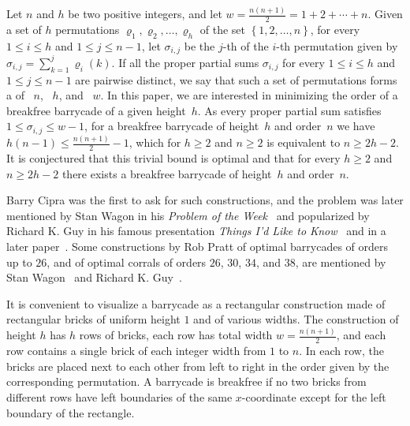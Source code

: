 \documentclass[runningheads,envcountsame]{llncs}
\newcommand{\set}[1]{\left\{ #1 \right\}}
\let\le\leqslant
\let\ge\geqslant
\let\rho\varrho
\begin{document}
Let $n$ and $h$ be two positive integers, and let $w=\frac{n(n+1)}{2} = 1 + 2 + \cdots + n$.
Given a set of $h$ permutations $\rho_1,\rho_2,\ldots,\rho_h$ of the set $\set{1,2,\ldots,n}$, for every $1\le i \le h$ and $1 \le j \le n-1$, let $\sigma_{i,j}$ be the $j$-th  of the $i$-th permutation given by $\sigma_{i,j} = \sum_{k=1}^{j} \rho_i(k)$.
If all the proper partial sums $\sigma_{i,j}$ for every $1 \le i \le h$ and $1 \le j \le n-1$ are pairwise distinct, we say that such a set of permutations forms a  of ~$n$, ~$h$, and ~$w$.
In this paper, we are interested in minimizing the order of a breakfree barrycade of a given height~$h$.
As every proper partial sum satisfies $1 \le \sigma_{i,j} \le w - 1$, for a breakfree barrycade of height~$h$ and order~$n$ we have $h(n-1) \le \frac{n(n+1)}{2}-1$, which for $h\ge 2$ and $n \ge 2$ is equivalent to $n \ge 2h-2$.
It is conjectured that this trivial bound is optimal and that for every $h \ge 2$ and $n \ge 2h-2$ there exists a breakfree barrycade of height~$h$ and order~$n$.

Barry Cipra was the first to ask for such constructions, and the problem was later mentioned by Stan Wagon in his \textit{Problem of the Week}~\cite{Wagon2011} and popularized by Richard K. Guy in his famous presentation \textit{Things I’d Like to Know}~\cite{Guy2016} and in a later paper~\cite{Guy2020}.
Some constructions by Rob Pratt of optimal barrycades of orders up to $26$, and of optimal corrals of orders $26$, $30$, $34$, and $38$, are mentioned by Stan Wagon~\cite{Wagon2011} and Richard K. Guy~\cite{Guy2016,Guy2020}.

It is convenient to visualize a barrycade as a rectangular construction made of rectangular bricks of uniform height $1$ and of various widths.
The construction of height $h$ has $h$ rows of bricks, each row has total width $w=\frac{n(n+1)}{2}$, and each row contains a single brick of each integer width from $1$ to $n$.
In each row, the bricks are placed next to each other from left to right in the order given by the corresponding permutation.
A barrycade is breakfree if no two bricks from different rows have left boundaries of the same $x$-coordinate except for the left boundary of the rectangle.
\end{document}
